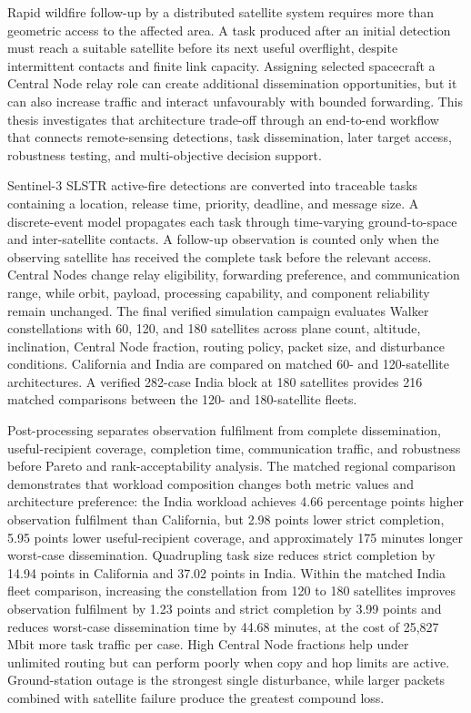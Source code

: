 Rapid wildfire follow-up by a distributed satellite system requires more than geometric access to the affected area. A task produced after an initial detection must reach a suitable satellite before its next useful overflight, despite intermittent contacts and finite link capacity. Assigning selected spacecraft a Central Node relay role can create additional dissemination opportunities, but it can also increase traffic and interact unfavourably with bounded forwarding. This thesis investigates that architecture trade-off through an end-to-end workflow that connects remote-sensing detections, task dissemination, later target access, robustness testing, and multi-objective decision support.

Sentinel-3 SLSTR active-fire detections are converted into traceable tasks containing a location, release time, priority, deadline, and message size. A discrete-event model propagates each task through time-varying ground-to-space and inter-satellite contacts. A follow-up observation is counted only when the observing satellite has received the complete task before the relevant access. Central Nodes change relay eligibility, forwarding preference, and communication range, while orbit, payload, processing capability, and component reliability remain unchanged. The final verified simulation campaign evaluates Walker constellations with 60, 120, and 180 satellites across plane count, altitude, inclination, Central Node fraction, routing policy, packet size, and disturbance conditions. California and India are compared on matched 60- and 120-satellite architectures. A verified 282-case India block at 180 satellites provides 216 matched comparisons between the 120- and 180-satellite fleets.

Post-processing separates observation fulfilment from complete dissemination, useful-recipient coverage, completion time, communication traffic, and robustness before Pareto and rank-acceptability analysis. The matched regional comparison demonstrates that workload composition changes both metric values and architecture preference: the India workload achieves 4.66 percentage points higher observation fulfilment than California, but 2.98 points lower strict completion, 5.95 points lower useful-recipient coverage, and approximately 175 minutes longer worst-case dissemination. Quadrupling task size reduces strict completion by 14.94 points in California and 37.02 points in India. Within the matched India fleet comparison, increasing the constellation from 120 to 180 satellites improves observation fulfilment by 1.23 points and strict completion by 3.99 points and reduces worst-case dissemination time by 44.68 minutes, at the cost of 25,827 Mbit more task traffic per case. High Central Node fractions help under unlimited routing but can perform poorly when copy and hop limits are active. Ground-station outage is the strongest single disturbance, while larger packets combined with satellite failure produce the greatest compound loss.

